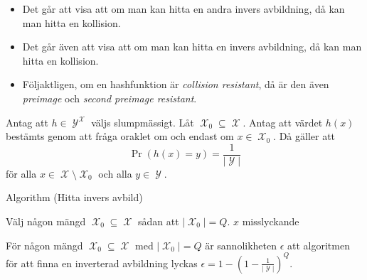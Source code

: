 \documentclass{beamer}
\newenvironment{algorithm}[1]{%
  \begin{block}{Algorithm (#1)}
}{%
  \end{block}
}
\theoremstyle{definition}
\DeclareMathOperator{\X}{\mathcal{X}}
\DeclareMathOperator{\Y}{\mathcal{Y}}
\DeclareMathOperator{\N}{\mathbb{N}}
\begin{document}
\begin{frame}{\insertsubsectionhead}
  \begin{itemize}
    \item Det går att visa att om man kan hitta en andra invers avbildning, då 
      kan man hitta en kollision.

    \item Det går även att visa att om man kan hitta en invers avbildning, då 
      kan man hitta en kollision.

    \item Följaktligen, om en hashfunktion är \emph{collision resistant}, då är 
      den även \emph{preimage} och \emph{second preimage resistant}.

  \end{itemize}
\end{frame}

\begin{frame}{\insertsubsectionhead}
  \begin{theorem}[Oberoendesatsen]
    Antag att \(h\in \Y^{\X}\) väljs slumpmässigt.
    Låt \(\X_0\subseteq \X\).
    Antag att värdet \(h(x)\) bestämts genom att fråga oraklet om och endast om 
    \(x\in \X_0\).
    Då gäller att \[\Pr(h(x) = y) = \frac{1}{|\Y|}\] för alla \(x\in \X 
    \setminus \X_0\) och alla \(y\in \Y\).
  \end{theorem}
\end{frame}

\begin{frame}{\insertsubsectionhead}
  \begin{algorithm}{Hitta invers avbild}
    \begin{algorithmic}
      \Require{\(h\in \Y^{\X}, y\in \Y, Q\in \N\)}
      \Statex
      \State Välj någon mängd \(\X_0\subseteq \X\) sådan att \(|\X_0| = Q\).
      \ForAll{\(x\in \X_0\)}
          \State \Return \(x\)
        \EndIf
      \EndFor
      \State \Return misslyckande
    \end{algorithmic}
  \end{algorithm}
\end{frame}

\begin{frame}{\insertsubsectionhead}
  \begin{theorem}
    För någon mängd \(\X_0\subseteq \X\) med \(|\X_0| = Q\) är sannolikheten 
    \(\epsilon\) att algoritmen för att finna en inverterad avbildning lyckas 
    \(\epsilon = 1 - \left(1 - \frac{1}{|\Y|}\right)^Q\).
  \end{theorem}
\end{frame}
\end{document}

